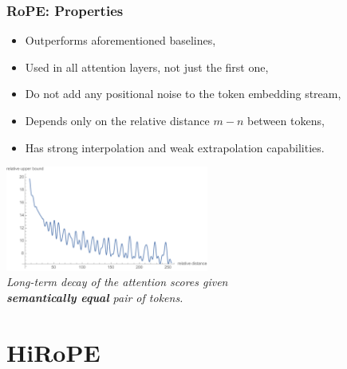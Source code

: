 \documentclass[notheorems,10pt]{beamer}
\begin{document}
\begin{frame}
    \frametitle{RoPE: Properties}

    \begin{itemize}
        \item Outperforms aforementioned baselines,
        \item Used in all attention layers, not just the first one,
        \item Do not add any positional noise to the token embedding stream,
        \item Depends only on the relative distance $m - n$ between tokens,
        \item Has strong interpolation and weak extrapolation capabilities.
    \end{itemize}

    \begin{center}
        \includegraphics[width=0.5\textwidth]{attachments/long-term-decay.pdf}
        \\[1ex]
        \textit{Long-term decay of the attention scores given \\ \textbf{semantically equal} pair of tokens.}
    \end{center}
\end{frame}

\section[HiRoPE]{HiRoPE}
\end{document}
